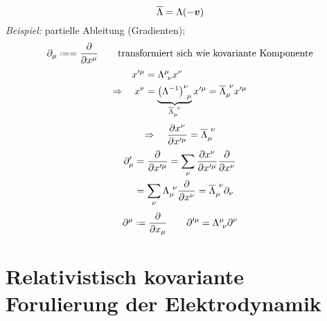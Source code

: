 \begin{equation*}
\overline{\Lambda} = \Lambda(- \bm{v})
\end{equation*}
\emph{Beispiel:} partielle Ableitung (Gradienten);
\begin{equation*}
\partial_{\mu} \defeq = \prt{}{x^{\mu}} \qquad \tx{transformiert sich wie kovariante Komponente}
\end{equation*}
\begin{align*}
x'^{\mu} &= \Lambda ^{\mu} _{\ \nu} x^{\nu} \\
\Rightarrow \quad x^{\nu} &= \ub{\left(\Lambda^{-1}\right)^{\nu}_{\ \mu}}_{\ol{\Lambda}_{\mu} ^{\ \nu}} x'^{\mu} = \ol{\Lambda}_{\mu} ^{\ \nu} x'^{\mu}
\end{align*}
\begin{equation*}
\Rightarrow \quad \frac{\partial x^{\nu}}{\partial x'^{\mu}} = \overline{\Lambda} _{\mu} ^{ \ \nu}
\end{equation*}
\begin{align*}
\partial '_{\mu} &= \frac{\partial }{\partial x'^{\mu}} = \sum_{\nu} \frac{\partial x^{\nu}}{\partial x'^{\mu}} \frac{\partial }{\partial x^{\nu}} \\
&= \sum_{\nu} \Lambda_{\mu}^{\ \nu} \frac{\partial }{\partial x^{\nu}} = \overline{\Lambda}_{\mu}^{\ \nu} \partial_{\nu}
\end{align*}
\begin{equation*}
\partial ^{\mu} \defeq \prt{}{x_{\mu}} \qquad \partial '^{\mu} = \Lambda^{\mu} _{\ \nu} \partial ^{\nu}
\end{equation*}

\section{Relativistisch kovariante Forulierung der Elektrodynamik}

